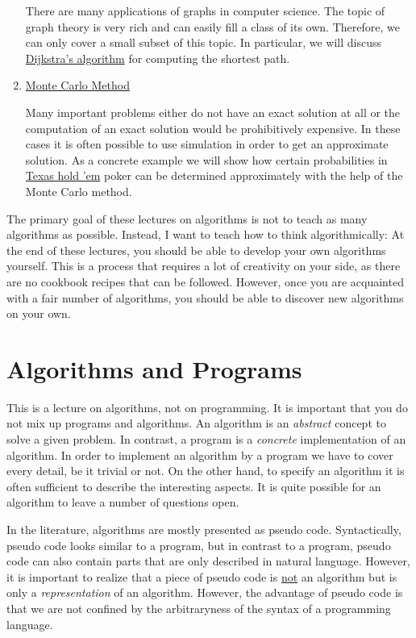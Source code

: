 \begin{enumerate}
      There are many applications of graphs in computer science.  The topic of graph theory is very
      rich and can easily fill a class of its own.  Therefore, we can only cover a small subset of this topic.
      In particular, we will discuss
      \href{http://en.wikipedia.org/wiki/Dijkstra%27s_algorithm}{Dijkstra's algorithm}
      for computing the shortest path.
\item \href{http://en.wikipedia.org/wiki/Monte_Carlo_method}{Monte Carlo Method} 
 
      Many important problems either do not have an exact solution at all or the computation of an
      exact solution would be prohibitively expensive.  In these cases it is often possible to use 
      simulation in order to get an approximate solution.  As a concrete example we will show
      how certain probabilities in \href{http://en.wikipedia.org/wiki/Texas_hold_%27em}{Texas hold 'em} 
      poker can be determined approximately with the help of the Monte
      Carlo method.
\end{enumerate}
The primary goal of these lectures on algorithms is not to teach as many algorithms as possible.
Instead, I want to teach how to think algorithmically:  At the end of these
lectures, you should be able to develop your own algorithms yourself.  This is a process that
requires a lot of creativity on your side, as there are no cookbook recipes that can be followed.
However, once you are acquainted with a fair number of algorithms, you should be able to discover
new algorithms on your own.

\section{Algorithms and Programs}
This is a lecture on algorithms, not on programming.  It is important that you do not mix up
programs and algorithms.  An algorithm is an \emph{abstract} concept to solve a given problem.  In
contrast, a program is a \emph{concrete} implementation of an algorithm.  In order to implement an
algorithm by a program we have to cover every detail, be it trivial or not.  On the other hand, 
to specify an algorithm it is often sufficient to describe the interesting aspects.  It is
quite possible for an algorithm to leave a number of questions open.

In the literature, algorithms are mostly presented as pseudo code.  Syntactically, pseudo code looks
similar to a program, but in contrast to a program, pseudo code can also contain parts that are only
described in natural language.   However, it is important to realize that a piece of pseudo code is
\underline{not} an algorithm but is only a \emph{ representation} of an algorithm.  However, the
advantage of pseudo code is that we are not confined by the arbitraryness of the syntax of a
programming language.


